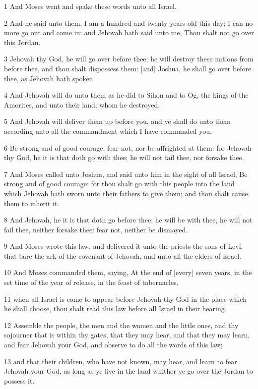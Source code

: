 \par 1 And Moses went and spake these words unto all Israel.
\par 2 And he said unto them, I am a hundred and twenty years old this day; I can no more go out and come in: and Jehovah hath said unto me, Thou shalt not go over this Jordan.
\par 3 Jehovah thy God, he will go over before thee; he will destroy these nations from before thee, and thou shalt dispossess them: [and] Joshua, he shall go over before thee, as Jehovah hath spoken.
\par 4 And Jehovah will do unto them as he did to Sihon and to Og, the kings of the Amorites, and unto their land; whom he destroyed.
\par 5 And Jehovah will deliver them up before you, and ye shall do unto them according unto all the commandment which I have commanded you.
\par 6 Be strong and of good courage, fear not, nor be affrighted at them: for Jehovah thy God, he it is that doth go with thee; he will not fail thee, nor forsake thee.
\par 7 And Moses called unto Joshua, and said unto him in the sight of all Israel, Be strong and of good courage: for thou shalt go with this people into the land which Jehovah hath sworn unto their fathers to give them; and thou shalt cause them to inherit it.
\par 8 And Jehovah, he it is that doth go before thee; he will be with thee, he will not fail thee, neither forsake thee: fear not, neither be dismayed.
\par 9 And Moses wrote this law, and delivered it unto the priests the sons of Levi, that bare the ark of the covenant of Jehovah, and unto all the elders of Israel.
\par 10 And Moses commanded them, saying, At the end of [every] seven years, in the set time of the year of release, in the feast of tabernacles,
\par 11 when all Israel is come to appear before Jehovah thy God in the place which he shall choose, thou shalt read this law before all Israel in their hearing.
\par 12 Assemble the people, the men and the women and the little ones, and thy sojourner that is within thy gates, that they may hear, and that they may learn, and fear Jehovah your God, and observe to do all the words of this law;
\par 13 and that their children, who have not known, may hear, and learn to fear Jehovah your God, as long as ye live in the land whither ye go over the Jordan to possess it.
